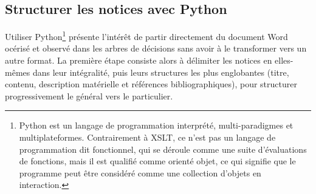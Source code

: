 \documentclass[a4paper,12pt,twoside]{book}
\begin{document}
	\subsection{Structurer les notices avec Python}
	
Utiliser Python\footnote{Python est un langage de programmation interprété, multi-paradigmes et multiplateformes. Contrairement à XSLT, ce n'est pas un langage de programmation dit \og fonctionnel\fg{}, qui se déroule comme une suite d'évaluations de fonctions, mais il est qualifié comme \og orienté objet\fg{}, ce qui signifie que le programme peut être considéré comme une collection d'objets en interaction.} présente l'intérêt de partir directement du document Word océrisé et observé dans les arbres de décisions sans avoir à le transformer vers un autre format. La première étape consiste alors à délimiter les notices en elles-mêmes dans leur intégralité, puis leurs structures les plus englobantes (titre, contenu, description matérielle et références bibliographiques), pour structurer progressivement le général vers le particulier. 
\end{document}
